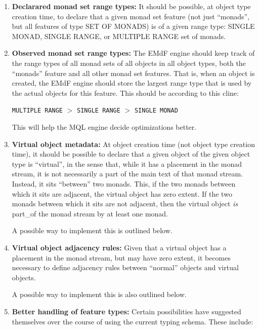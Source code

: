 \documentclass[a4paper,12pt]{article}
\begin{document}
\begin{enumerate}
\item \textbf{Declarared monad set range types:} It should be
  possible, at object type creation time, to declare that a given
  monad set feature (not just ``monads'', but all features of type SET
  OF MONADS) is of a given range type: SINGLE MONAD, SINGLE RANGE, or
  MULTIPLE RANGE set of monads.
  
\item \textbf{Observed monad set range types:} The EMdF engine should
  keep track of the range types of all monad sets of all objects in
  all object types, both the ``monads'' feature and all other monad
  set features.  That is, when an object is created, the EMdF engine
  should store the largest range type that is used by the actual
  objects for this feature.  This should be according to this cline:

  \begin{center}
    \texttt{MULTIPLE RANGE} $>$ \texttt{SINGLE RANGE} $>$ \texttt{SINGLE MONAD}
  \end{center}
  
  \noindent This will help the MQL engine decide optimizations better.
  
\item \textbf{Virtual object metadata:} At object creation time (not
  object type creation time), it should be possible to declare that a
  given object of the given object type is ``virtual'', in the sense
  that, while it has a placement in the monad stream, it is not
  necessarily a part of the main text of that monad stream.  Instead,
  it sits ``between'' two monads.  This, if the two monads between
  which it sits are adjacent, the virtual object has zero extent.  If
  the two monads between which it sits are not adjacent, then the
  virtual object \textit{is} part\_of the monad stream by at least one
  monad.
 
  A possible way to implement this is outlined below.
 
\item \textbf{Virtual object adjacency rules:} Given that a virtual
  object has a placement in the monad stream, but may have zero
  extent, it becomes necessary to define adjacency rules between
  ``normal'' objects and virtual objects.

  A possible way to implement this is also outlined below.

\item \textbf{Better handling of feature types:} Certain
  possibilities have suggested themselves over the course of using
  the current typing schema.  These include:
  

\end{enumerate}
\end{document}
